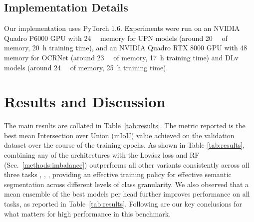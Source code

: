 \documentclass[runningheads]{llncs}
\newcommand{\dvp}{DLv}
\newcommand{\upr}{UPN}
\newcommand{\lov}{Lov\'{a}sz}
\newcommand{\ta}[1]{\textbf{}}
\begin{document}
\subsection{Implementation Details}\label{methods:ware}
Our implementation uses PyTorch 1.6. Experiments were run on an NVIDIA Quadro P6000 GPU with \SI{24}{\giga\byte} memory for \upr{} models (around \SI{20}{\giga\byte} of memory, \SI{20}{\hour} training time), and an NVIDIA Quadro RTX 8000 GPU with \SI{48}{\giga\byte} memory for OCRNet (around \SI{23}{\giga\byte} of memory, \SI{17}{\hour} training time) and \dvp{} models (around \SI{24}{\giga\byte} of memory, \SI{25}{\hour} training time).

\section{Results and Discussion}\label{results}
The main results are collated in Table~\ref{tab:results}. The metric reported is the best mean Intersection over Union (mIoU) value achieved on the validation dataset over the course of the  training epochs. As shown in Table \ref{tab:results}, combining any of the architectures with the \lov{} loss and RF (Sec.~\ref{methods:imbalance}) outperforms all other variants consistently across all three tasks \ta1, \ta2, \ta3, providing an effective training policy for effective semantic segmentation across different levels of class granularity. We also observed that a mean ensemble of the best models per head further improves performance on all tasks, as reported in Table~\ref{tab:results}. Following are our key conclusions for what matters for high performance in this benchmark.
\end{document}
